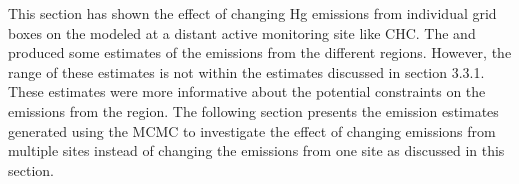 
        




\begin{flushleft}
     This section has shown the effect of changing Hg emissions from individual grid boxes on the modeled \hgc at a distant active monitoring site like CHC. The \iq and \nft produced some estimates of the \hg emissions from the different regions. However, the range of these estimates is not within the estimates discussed in  section 3.3.1. These estimates were more informative about the potential constraints on the emissions from the region. The following section presents the emission estimates generated using the MCMC to investigate the effect of changing emissions from multiple sites instead of changing the emissions from one site as discussed in this section.  
     

   
 
\end{flushleft}

